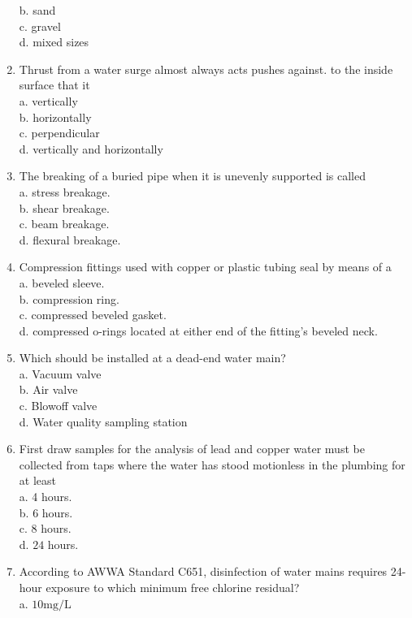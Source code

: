 \begin{enumerate}[1.]
b. sand\\
c. gravel\\
d. mixed sizes\\
\item Thrust from a water surge almost always acts pushes against. to the inside surface that it\\
a. vertically\\
b. horizontally\\
c. perpendicular\\
d. vertically and horizontally\\
\item The breaking of a buried pipe when it is unevenly supported is called\\
a. stress breakage.\\
b. shear breakage.\\
c. beam breakage.\\
d. flexural breakage.\\
\item Compression fittings used with copper or plastic tubing seal by means of a\\
a. beveled sleeve.\\
b. compression ring.\\
c. compressed beveled gasket.\\
d. compressed o-rings located at either end of the fitting's beveled neck.\\
\item Which should be installed at a dead-end water main?\\
a. Vacuum valve\\
b. Air valve\\
c. Blowoff valve\\
d. Water quality sampling station\\
\item First draw samples for the analysis of lead and copper water must be collected from taps where the water has stood motionless in the plumbing for at least\\
a. 4 hours.\\
b. 6 hours.\\
c. 8 hours.\\
d. $ 24$ hours.\\
\item According to AWWA Standard C651, disinfection of water mains requires 24-hour exposure to which minimum free chlorine residual?\\
a. $10 \mathrm{mg} / \mathrm{L}$\\

\end{enumerate}
